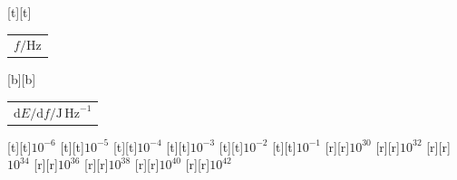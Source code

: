 %    
%
%
\begin{psfrags}%
\psfragscanon%
%
[t][t]{\color[rgb]{0,0,0}\setlength{\tabcolsep}{0pt}\begin{tabular}{c}$f/\mathrm{Hz}$\end{tabular}}%
[b][b]{\color[rgb]{0,0,0}\setlength{\tabcolsep}{0pt}\begin{tabular}{c}$\mathrm{d}E/\mathrm{d}{f}/\mathrm{J\,Hz}^{-1}$\end{tabular}}%
%
[t][t]{$10^{-6}$}%
[t][t]{$10^{-5}$}%
[t][t]{$10^{-4}$}%
[t][t]{$10^{-3}$}%
[t][t]{$10^{-2}$}%
[t][t]{$10^{-1}$}%
%
[r][r]{$10^{30}$}%
[r][r]{$10^{32}$}%
[r][r]{$10^{34}$}%
[r][r]{$10^{36}$}%
[r][r]{$10^{38}$}%
[r][r]{$10^{40}$}%
[r][r]{$10^{42}$}%
%
%
\end{psfrags}%
%
